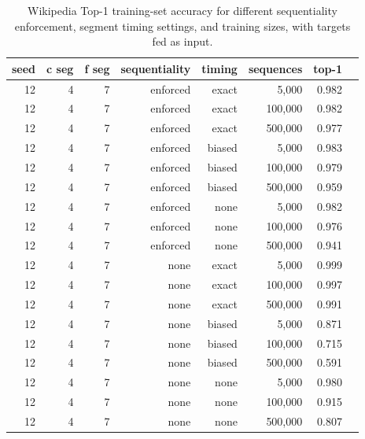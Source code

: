 \begin{table}[H]
\centering
\caption{Wikipedia Top-1 training-set accuracy for different sequentiality enforcement, segment timing settings, and training sizes, with targets fed as input.}
\label{tab:wiki-train-top1-accuracy-time}
\begin{tabular}{rrrrrrrr}
\toprule
\textbf{seed} & \textbf{c seg} & \textbf{f seg} & \textbf{sequentiality} & \textbf{timing} & \textbf{sequences} & \textbf{top-1} \\
\midrule
12 & 4 & 7 & enforced & exact & 5,000   & 0.982 \\
12 & 4 & 7 & enforced & exact & 100,000 & 0.982 \\
12 & 4 & 7 & enforced & exact & 500,000 & 0.977 \\
12 & 4 & 7 & enforced & biased & 5,000   & 0.983 \\
12 & 4 & 7 & enforced & biased & 100,000 & 0.979 \\
12 & 4 & 7 & enforced & biased & 500,000 & 0.959 \\
12 & 4 & 7 & enforced & none & 5,000   & 0.982 \\
12 & 4 & 7 & enforced & none & 100,000 & 0.976 \\
12 & 4 & 7 & enforced & none & 500,000 & 0.941 \\
12 & 4 & 7 & none & exact & 5,000   & 0.999 \\
12 & 4 & 7 & none & exact & 100,000 & 0.997 \\
12 & 4 & 7 & none & exact & 500,000 &  0.991 \\
12 & 4 & 7 & none & biased & 5,000   & 0.871 \\
12 & 4 & 7 & none & biased & 100,000 & 0.715 \\
12 & 4 & 7 & none & biased & 500,000 & 0.591 \\
12 & 4 & 7 & none & none & 5,000   & 0.980 \\
12 & 4 & 7 & none & none & 100,000 & 0.915 \\
12 & 4 & 7 & none & none & 500,000 & 0.807 \\
\bottomrule
\end{tabular}
\end{table}

